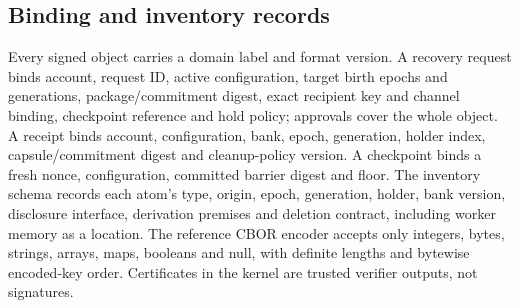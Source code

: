 \documentclass[pdflatex,sn-mathphys-num]{sn-jnl}
\theoremstyle{plain}
\theoremstyle{definition}
\begin{document}
\begin{appendices}
\section{Binding and inventory records}\label{app:binding}
Every signed object carries a domain label and format version. A recovery request binds account, request ID, active configuration, target birth epochs and generations, package/commitment digest, exact recipient key and channel binding, checkpoint reference and hold policy; approvals cover the whole object. A receipt binds account, configuration, bank, epoch, generation, holder index, capsule/commitment digest and cleanup-policy version. A checkpoint binds a fresh nonce, configuration, committed barrier digest and floor. The inventory schema records each atom's type, origin, epoch, generation, holder, bank version, disclosure interface, derivation premises and deletion contract, including worker memory as a location. The reference CBOR encoder accepts only integers, bytes, strings, arrays, maps, booleans and null, with definite lengths and bytewise encoded-key order. Certificates in the kernel are trusted verifier outputs, not signatures.
\end{appendices}


\end{document}
